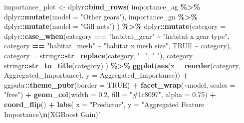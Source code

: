 \documentclass[
]{book}
\newenvironment{Shaded}{\begin{snugshade}}{\end{snugshade}}
\newcommand{\AttributeTok}[1]{\textcolor[rgb]{0.13,0.29,0.53}{#1}}
\newcommand{\ConstantTok}[1]{\textcolor[rgb]{0.56,0.35,0.01}{#1}}
\newcommand{\FloatTok}[1]{\textcolor[rgb]{0.00,0.00,0.81}{#1}}
\newcommand{\FunctionTok}[1]{\textcolor[rgb]{0.13,0.29,0.53}{\textbf{#1}}}
\newcommand{\NormalTok}[1]{#1}
\newcommand{\OtherTok}[1]{\textcolor[rgb]{0.56,0.35,0.01}{#1}}
\newcommand{\SpecialCharTok}[1]{\textcolor[rgb]{0.81,0.36,0.00}{\textbf{#1}}}
\newcommand{\StringTok}[1]{\textcolor[rgb]{0.31,0.60,0.02}{#1}}
\begin{document}
\begin{Shaded}
\begin{Highlighting}[]
\NormalTok{importance\_plot }\OtherTok{\textless{}{-}}
\NormalTok{  dplyr}\SpecialCharTok{::}\FunctionTok{bind\_rows}\NormalTok{(}
\NormalTok{    importance\_ag }\SpecialCharTok{\%\textgreater{}\%}\NormalTok{ dplyr}\SpecialCharTok{::}\FunctionTok{mutate}\NormalTok{(}\AttributeTok{model =} \StringTok{"Other gears"}\NormalTok{),}
\NormalTok{    importance\_gn }\SpecialCharTok{\%\textgreater{}\%}\NormalTok{ dplyr}\SpecialCharTok{::}\FunctionTok{mutate}\NormalTok{(}\AttributeTok{model =} \StringTok{"Gill nets"}\NormalTok{)}
\NormalTok{  ) }\SpecialCharTok{\%\textgreater{}\%} 
\NormalTok{  dplyr}\SpecialCharTok{::}\FunctionTok{mutate}\NormalTok{(}\AttributeTok{category =}\NormalTok{ dplyr}\SpecialCharTok{::}\FunctionTok{case\_when}\NormalTok{(category }\SpecialCharTok{==} \StringTok{"habitat\_gear"} \SpecialCharTok{\textasciitilde{}} \StringTok{"habitat x gear type"}\NormalTok{,}
\NormalTok{                                            category }\SpecialCharTok{==} \StringTok{"habitat\_mesh"} \SpecialCharTok{\textasciitilde{}} \StringTok{"habitat x mesh size"}\NormalTok{,}
                                            \ConstantTok{TRUE} \SpecialCharTok{\textasciitilde{}}\NormalTok{ category),}
                \AttributeTok{category =}\NormalTok{ stringr}\SpecialCharTok{::}\FunctionTok{str\_replace}\NormalTok{(category, }\StringTok{"\_"}\NormalTok{, }\StringTok{" "}\NormalTok{),}
                \AttributeTok{category =}\NormalTok{ stringr}\SpecialCharTok{::}\FunctionTok{str\_to\_title}\NormalTok{(category)}
\NormalTok{                ) }\SpecialCharTok{\%\textgreater{}\%} 
  \FunctionTok{ggplot}\NormalTok{(}\FunctionTok{aes}\NormalTok{(}\AttributeTok{x =} \FunctionTok{reorder}\NormalTok{(category, Aggregated\_Importance), }\AttributeTok{y =}\NormalTok{ Aggregated\_Importance)) }\SpecialCharTok{+}
\NormalTok{  ggpubr}\SpecialCharTok{::}\FunctionTok{theme\_pubr}\NormalTok{(}\AttributeTok{border =} \ConstantTok{TRUE}\NormalTok{) }\SpecialCharTok{+}
  \FunctionTok{facet\_wrap}\NormalTok{(}\SpecialCharTok{\textasciitilde{}}\NormalTok{model, }\AttributeTok{scales =} \StringTok{"free"}\NormalTok{) }\SpecialCharTok{+}
  \FunctionTok{geom\_col}\NormalTok{(}\AttributeTok{width =} \FloatTok{0.2}\NormalTok{, }\AttributeTok{fill =} \StringTok{"\#1c8097"}\NormalTok{, }\AttributeTok{alpha =} \FloatTok{0.75}\NormalTok{) }\SpecialCharTok{+}
  \FunctionTok{coord\_flip}\NormalTok{() }\SpecialCharTok{+}
  \FunctionTok{labs}\NormalTok{(}
    \AttributeTok{x =} \StringTok{"Predictor"}\NormalTok{,}
    \AttributeTok{y =} \StringTok{"Aggregated Feature Importance}\SpecialCharTok{\textbackslash{}n}\StringTok{(XGBoost Gain)"}

\end{Highlighting}
\end{Shaded}
\end{document}
